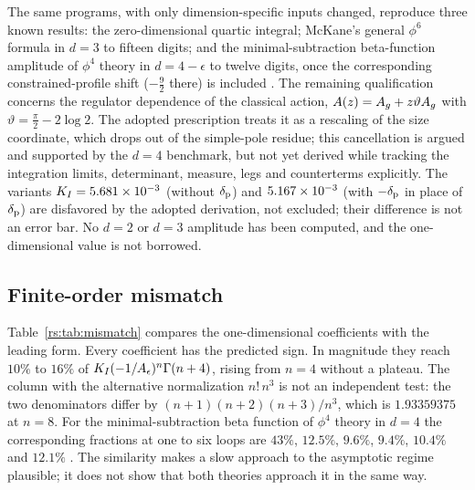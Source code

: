 The same programs, with only dimension-specific inputs changed, reproduce three known
results: the zero-dimensional quartic integral; McKane's general $\phi^6$ formula in
$d=3$ to fifteen digits; and the minimal-subtraction beta-function amplitude of $\phi^4$
theory in $d=4-\epsilon$ to twelve digits, once the corresponding constrained-profile
shift ($-\frac92$ there) is included \cite{rs:McKane:2018ocs,rs:McKaneWallaceBonfim}. The
remaining qualification concerns the regulator dependence of the classical action,
$A(z)=A_g+z\vartheta A_g$ with $\vartheta=\frac\pi2-2\log2$. The adopted prescription
treats it as a rescaling of the size coordinate, which drops out of the simple-pole
residue; this cancellation is argued and supported by the $d=4$ benchmark, but not yet
derived while tracking the integration limits, determinant, measure, legs and
counterterms explicitly. The variants $K_I=5.681\times10^{-3}$ (without $\delta_{\rm p}$) and
$5.167\times10^{-3}$ (with $-\delta_{\rm p}$ in place of $\delta_{\rm p}$) are disfavored by the
adopted derivation, not excluded;
their difference is not an error bar. No $d=2$ or $d=3$ amplitude has been computed, and
the one-dimensional value is not borrowed.

\subsection{Finite-order mismatch}\label{rs:sec:mismatch}
Table~\ref{rs:tab:mismatch} compares the one-dimensional coefficients with the leading
form. Every coefficient has the predicted sign. In magnitude they reach $10\%$ to $16\%$
of $K_I(-1/A_\epsilon)^n\Gamma(n+4)$, rising from $n=4$ without a plateau. The column with the
alternative normalization $n!\,n^3$ is not an independent test: the two denominators
differ by $(n+1)(n+2)(n+3)/n^3$, which is $1.93359375$ at $n=8$. For the
minimal-subtraction beta function of $\phi^4$ theory in $d=4$ the corresponding fractions
at one to six loops are $43\%$, $12.5\%$, $9.6\%$, $9.4\%$, $10.4\%$ and $12.1\%$
\cite{rs:Kompaniets:2017yct}. The similarity makes a slow approach to the asymptotic regime
plausible; it does not show that both theories approach it in the same way.

